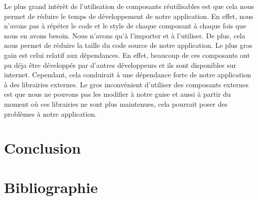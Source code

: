 \documentclass[12pt]{article}
\begin{document}
        Le plus grand intérêt de l'utilisation de composants réutilisables est que cela nous permet de réduire le temps de développement
        de notre application. En effet, nous n'avons pas à répéter le code et le style de chaque composant à chaque fois que nous en avons besoin.
        Nous n'avons qu'à l'importer et à l'utiliser. De plus, cela nous permet de réduire la taille du code source de notre application. Le plus
        gros gain est celui relatif aux dépendances. En effet, beaucoup de ces composants ont pu déja être développés par d'autres
        développeurs et ils sont disponibles sur internet. Cependant, cela conduirait à une dépendance forte de notre application à des librairies
        externes. Le gros inconvénient d'utiliser des composants externes est que nous ne pouvons pas les modifier à notre guise et
        aussi à partir du moment où ces librairies ne sont plus maintenues, cela pourrait poser des problèmes à notre application.

        \section{Conclusion}\label{sec:conclusion}

        \section{Bibliographie}\label{sec:bibliographie}

        
\end{document}
